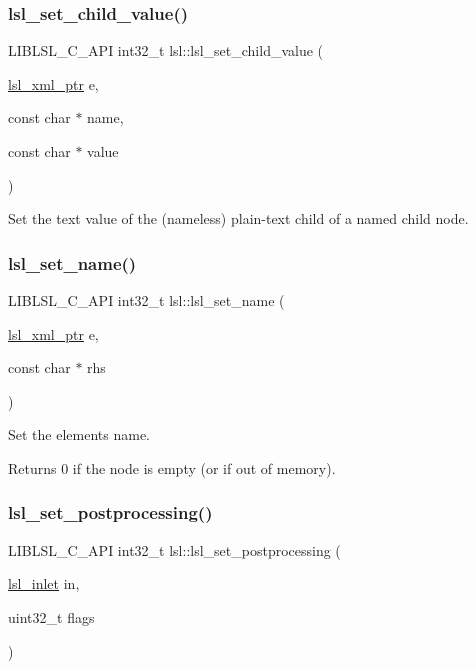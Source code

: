 \subsubsection{\texorpdfstring{lsl\+\_\+set\+\_\+child\+\_\+value()}{lsl\_set\_child\_value()}}
{\footnotesize\ttfamily L\+I\+B\+L\+S\+L\+\_\+\+C\+\_\+\+A\+PI int32\+\_\+t lsl\+::lsl\+\_\+set\+\_\+child\+\_\+value (\begin{DoxyParamCaption}\item[{\hyperlink{namespacelsl_a5edc7a49a1a1be1634fe6dce3d59c59b}{lsl\+\_\+xml\+\_\+ptr}}]{e,  }\item[{const char $\ast$}]{name,  }\item[{const char $\ast$}]{value }\end{DoxyParamCaption})}

Set the text value of the (nameless) plain-\/text child of a named child node. \mbox{\label{namespacelsl_af13c49d3abab79ae9dd6d94ca7cdc877}} 
\subsubsection{\texorpdfstring{lsl\+\_\+set\+\_\+name()}{lsl\_set\_name()}}
{\footnotesize\ttfamily L\+I\+B\+L\+S\+L\+\_\+\+C\+\_\+\+A\+PI int32\+\_\+t lsl\+::lsl\+\_\+set\+\_\+name (\begin{DoxyParamCaption}\item[{\hyperlink{namespacelsl_a5edc7a49a1a1be1634fe6dce3d59c59b}{lsl\+\_\+xml\+\_\+ptr}}]{e,  }\item[{const char $\ast$}]{rhs }\end{DoxyParamCaption})}

Set the element\textquotesingle{}s name. \begin{DoxyReturn}{Returns}
0 if the node is empty (or if out of memory). 
\end{DoxyReturn}
\mbox{\label{namespacelsl_a36fe6c26cb8c696b658c87490d4c1059}} 
\subsubsection{\texorpdfstring{lsl\+\_\+set\+\_\+postprocessing()}{lsl\_set\_postprocessing()}}
{\footnotesize\ttfamily L\+I\+B\+L\+S\+L\+\_\+\+C\+\_\+\+A\+PI int32\+\_\+t lsl\+::lsl\+\_\+set\+\_\+postprocessing (\begin{DoxyParamCaption}\item[{\hyperlink{namespacelsl_a884a3363cfcba75d7ce8f00c1c4c54f1}{lsl\+\_\+inlet}}]{in,  }\item[{uint32\+\_\+t}]{flags }\end{DoxyParamCaption})}

